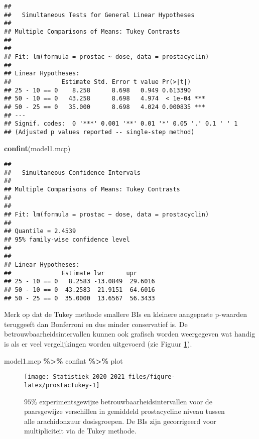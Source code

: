 \documentclass[
  12pt,dutch,coursenotes]{book}
\newenvironment{Shaded}{\begin{snugshade}}{\end{snugshade}}
\newcommand{\KeywordTok}[1]{\textcolor[rgb]{0.13,0.29,0.53}{\textbf{#1}}}
\newcommand{\NormalTok}[1]{#1}
\newcommand{\OperatorTok}[1]{\textcolor[rgb]{0.81,0.36,0.00}{\textbf{#1}}}
\newcommand{\StringTok}[1]{\textcolor[rgb]{0.31,0.60,0.02}{#1}}
\theoremstyle{definition}
\theoremstyle{definition}
\theoremstyle{definition}
\theoremstyle{remark}
\begin{document}
\begin{verbatim}
## 
##   Simultaneous Tests for General Linear Hypotheses
## 
## Multiple Comparisons of Means: Tukey Contrasts
## 
## 
## Fit: lm(formula = prostac ~ dose, data = prostacyclin)
## 
## Linear Hypotheses:
##              Estimate Std. Error t value Pr(>|t|)    
## 25 - 10 == 0    8.258      8.698   0.949 0.613390    
## 50 - 10 == 0   43.258      8.698   4.974  < 1e-04 ***
## 50 - 25 == 0   35.000      8.698   4.024 0.000835 ***
## ---
## Signif. codes:  0 '***' 0.001 '**' 0.01 '*' 0.05 '.' 0.1 ' ' 1
## (Adjusted p values reported -- single-step method)
\end{verbatim}

\begin{Shaded}
\begin{Highlighting}[]
\KeywordTok{confint}\NormalTok{(model1.mcp)}
\end{Highlighting}
\end{Shaded}

\begin{verbatim}
## 
##   Simultaneous Confidence Intervals
## 
## Multiple Comparisons of Means: Tukey Contrasts
## 
## 
## Fit: lm(formula = prostac ~ dose, data = prostacyclin)
## 
## Quantile = 2.4539
## 95% family-wise confidence level
##  
## 
## Linear Hypotheses:
##              Estimate lwr      upr     
## 25 - 10 == 0   8.2583 -13.0849  29.6016
## 50 - 10 == 0  43.2583  21.9151  64.6016
## 50 - 25 == 0  35.0000  13.6567  56.3433
\end{verbatim}

Merk op dat de Tukey methode smallere BIs en kleinere aangepaste p-waarden teruggeeft dan Bonferroni en dus minder conservatief is.
De betrouwbaarheidsintervallen kunnen ook grafisch worden weergegeven wat handig is als er veel vergelijkingen worden uitgevoerd (zie Figuur \ref{fig:prostacTukey}).

\begin{Shaded}
\begin{Highlighting}[]
\NormalTok{model1.mcp }\OperatorTok{\%\textgreater{}\%}\StringTok{ }\NormalTok{confint }\OperatorTok{\%\textgreater{}\%}\StringTok{ }\NormalTok{plot}
\end{Highlighting}
\end{Shaded}

\begin{figure}

{\centering \texttt{[image: Statistiek\_2020\_2021\_files/figure-latex/prostacTukey-1]} 

}

\caption{$95\%$ experimentsgewijze betrouwbaarheidsintervallen voor de paarsgewijze verschillen in gemiddeld prostacycline niveau tussen alle arachidonzuur dosisgroepen. De BIs zijn gecorrigeerd voor multipliciteit via de Tukey methode.}\label{fig:prostacTukey}
\end{figure}
\end{document}
